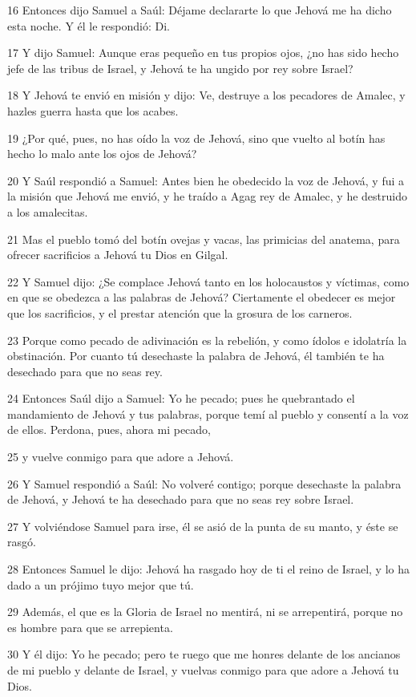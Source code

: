 \par 16 Entonces dijo Samuel a Saúl: Déjame declararte lo que Jehová me ha dicho esta noche. Y él le respondió: Di.
\par 17 Y dijo Samuel: Aunque eras pequeño en tus propios ojos, ¿no has sido hecho jefe de las tribus de Israel, y Jehová te ha ungido por rey sobre Israel?
\par 18 Y Jehová te envió en misión y dijo: Ve, destruye a los pecadores de Amalec, y hazles guerra hasta que los acabes.
\par 19 ¿Por qué, pues, no has oído la voz de Jehová, sino que vuelto al botín has hecho lo malo ante los ojos de Jehová?
\par 20 Y Saúl respondió a Samuel: Antes bien he obedecido la voz de Jehová, y fui a la misión que Jehová me envió, y he traído a Agag rey de Amalec, y he destruido a los amalecitas.
\par 21 Mas el pueblo tomó del botín ovejas y vacas, las primicias del anatema, para ofrecer sacrificios a Jehová tu Dios en Gilgal.
\par 22 Y Samuel dijo: ¿Se complace Jehová tanto en los holocaustos y víctimas, como en que se obedezca a las palabras de Jehová? Ciertamente el obedecer es mejor que los sacrificios, y el prestar atención que la grosura de los carneros.
\par 23 Porque como pecado de adivinación es la rebelión, y como ídolos e idolatría la obstinación. Por cuanto tú desechaste la palabra de Jehová, él también te ha desechado para que no seas rey.
\par 24 Entonces Saúl dijo a Samuel: Yo he pecado; pues he quebrantado el mandamiento de Jehová y tus palabras, porque temí al pueblo y consentí a la voz de ellos. Perdona, pues, ahora mi pecado,
\par 25 y vuelve conmigo para que adore a Jehová.
\par 26 Y Samuel respondió a Saúl: No volveré contigo; porque desechaste la palabra de Jehová, y Jehová te ha desechado para que no seas rey sobre Israel.
\par 27 Y volviéndose Samuel para irse, él se asió de la punta de su manto, y éste se rasgó.
\par 28 Entonces Samuel le dijo: Jehová ha rasgado hoy de ti el reino de Israel, y lo ha dado a un prójimo tuyo mejor que tú.
\par 29 Además, el que es la Gloria de Israel no mentirá, ni se arrepentirá, porque no es hombre para que se arrepienta.
\par 30 Y él dijo: Yo he pecado; pero te ruego que me honres delante de los ancianos de mi pueblo y delante de Israel, y vuelvas conmigo para que adore a Jehová tu Dios.
